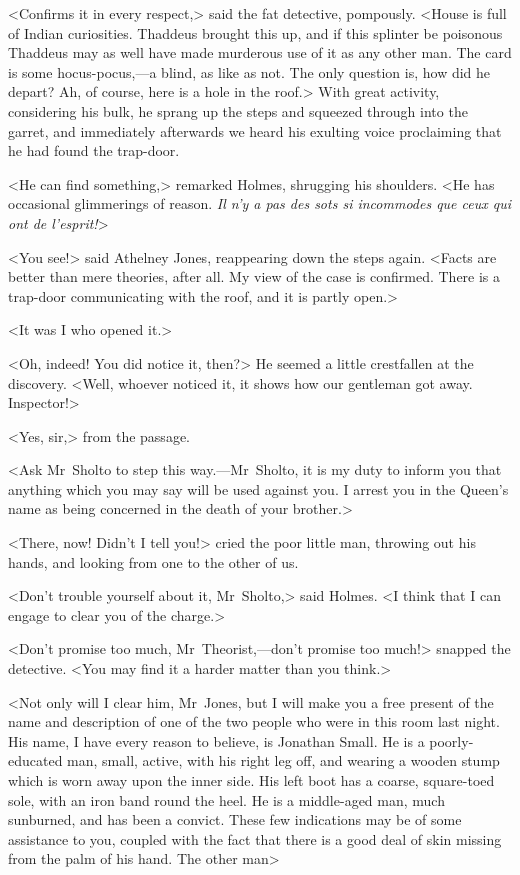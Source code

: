 <Confirms it in every respect,> said the fat detective, pompously. <House is full of Indian curiosities. Thaddeus brought this up, and if this splinter be poisonous Thaddeus may as well have made murderous use of it as any other man. The card is some hocus-pocus,—a blind, as like as not. The only question is, how did he depart? Ah, of course, here is a hole in the roof.> With great activity, considering his bulk, he sprang up the steps and squeezed through into the garret, and immediately afterwards we heard his exulting voice proclaiming that he had found the trap-door.

<He can find something,> remarked Holmes, shrugging his shoulders. <He has occasional glimmerings of reason. \textit{\textfrench{Il n'y a pas des sots si incommodes que ceux qui ont de l'esprit!}}>

<You see!> said Athelney Jones, reappearing down the steps again. <Facts are better than mere theories, after all. My view of the case is confirmed. There is a trap-door communicating with the roof, and it is partly open.>

<It was I who opened it.>

<Oh, indeed! You did notice it, then?> He seemed a little crestfallen at the discovery. <Well, whoever noticed it, it shows how our gentleman got away. Inspector!>

<Yes, sir,> from the passage.

<Ask Mr~Sholto to step this way.—Mr~Sholto, it is my duty to inform you that anything which you may say will be used against you. I arrest you in the Queen's name as being concerned in the death of your brother.>

<There, now! Didn't I tell you!> cried the poor little man, throwing out his hands, and looking from one to the other of us.

<Don't trouble yourself about it, Mr~Sholto,> said Holmes. <I think that I can engage to clear you of the charge.>

<Don't promise too much, Mr~Theorist,—don't promise too much!> snapped the detective. <You may find it a harder matter than you think.>

<Not only will I clear him, Mr~Jones, but I will make you a free present of the name and description of one of the two people who were in this room last night. His name, I have every reason to believe, is Jonathan Small. He is a poorly-educated man, small, active, with his right leg off, and wearing a wooden stump which is worn away upon the inner side. His left boot has a coarse, square-toed sole, with an iron band round the heel. He is a middle-aged man, much sunburned, and has been a convict. These few indications may be of some assistance to you, coupled with the fact that there is a good deal of skin missing from the palm of his hand. The other man\longdash>

